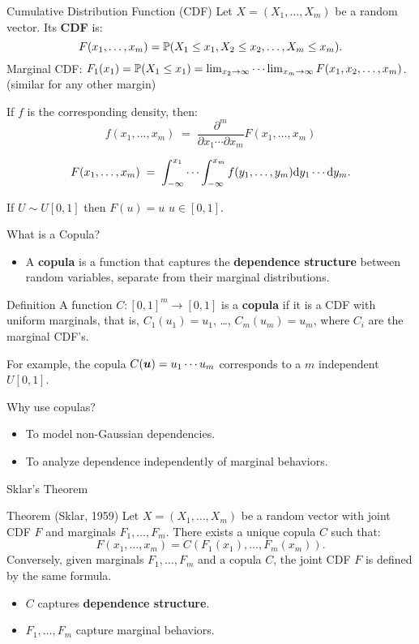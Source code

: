 \documentclass[11pt,handout,aspectratio=169]{beamer}
\begin{document}
\begin{frame}{Cumulative Distribution Function (CDF)}
	Let $X=(X_1,\ldots,X_m)$ be a random vector.  Its \textbf{CDF} is: $$F(x_1,\ldots,x_m)=\P(X_1\leq x_1,X_2\leq x_2,\ldots,X_m\leq x_m).$$
	Marginal CDF: $F_1(x_1)=\P(X_1\leq x_1)=\lim_{x_2\to \infty}\cdots\lim_{x_m\to\infty}F(x_1,x_2,\ldots,x_m)$.
	(similar for any other margin)\\[5mm]	
	\begin{block}{}
	If $f$ is the corresponding density, then:
	$$
	f(x_1,\ldots,x_m)\;=\;\frac{\partial^m}{\partial x_1\cdots\partial x_m}F(x_1,\ldots,x_m)
	$$
	
	$$
	F(x_1,\ldots,x_m)\;=\;\int_{-\infty}^{x_1}\cdots \int_{-\infty}^{x_m} f(y_1,\ldots,y_m){\rm d}y_1\cdots {\rm d} y_m. 
	$$		
	\end{block}
		If $U\sim U[0,1]$ then $F(u)=u$ $u\in [0,1]$.

\end{frame}


\begin{frame}{What is a Copula?}
\begin{itemize}
    \item A \textbf{copula} is a function that captures the \textbf{dependence structure} between random variables, separate from their marginal distributions.
\end{itemize}
\begin{alertblock}{Definition}
	A function $C : [0, 1]^m \to [0, 1]$ is a \textbf{copula} if it is a CDF with uniform marginals, that is, $C_1(u_1)=u_1$, \ldots, $C_m(u_m)=u_m$, where $C_i$ are the marginal CDF's.
\end{alertblock}
For example, the copula $C(\bs u)=u_1\cdots u_m$ corresponds to a $m$ independent $U[0,1]$.
\begin{block}{Why use copulas?}
	\begin{itemize}
        \item To model non-Gaussian dependencies.
        \item To analyze dependence independently of marginal behaviors.
    \end{itemize}
\end{block}
\end{frame}

\begin{frame}{Sklar's Theorem}
\begin{block}{Theorem (Sklar, 1959)}
Let $X = (X_1, \ldots, X_m)$ be a random vector with joint CDF $F$ and marginals $F_1, \ldots, F_m$. There exists a unique copula $C$ such that:
\[ F(x_1, \dots, x_m) = C(F_1(x_1), \dots, F_m(x_m)). \]
Conversely, given marginals $F_1, \ldots, F_m$ and a copula $C$, the joint CDF $F$ is defined by the same formula.
\end{block}
\begin{itemize}
    \item $C$ captures \textbf{dependence structure}.
    \item $F_1, \ldots, F_m$ capture marginal behaviors.
\end{itemize}
\end{frame}
\end{document}
